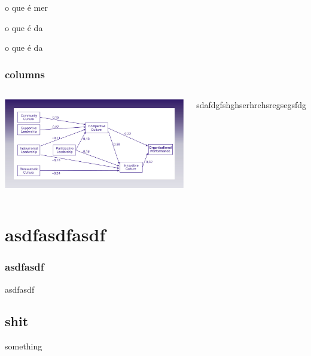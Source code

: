 \documentclass[aspectratio=169]{beamer}
\begin{document}
\begin{frame}

\begin{block}{o que é}
mer
\end{block}
\begin{alertblock}{o que é}
da
\end{alertblock}
\begin{exampleblock}{o que é}
da
\end{exampleblock}

\end{frame}


\begin{frame}
\frametitle{columns}

\begin{columns}

\includegraphics[scale=.1]{"./image/OB/Ogbonna_Harris.jpg"}


sdafdgfshghserhrehsregsegsfdg

\end{columns}

\end{frame}



\section{asdfasdfasdf}

\begin{frame}
\frametitle{asdfasdf}

asdfasdf

\end{frame}

\subsection{shit}
something
\end{document}
